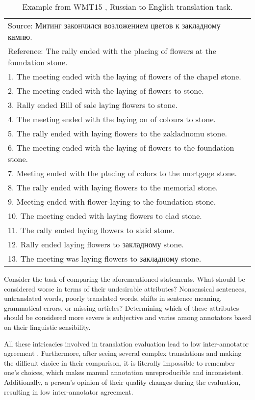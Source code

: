 \begin{table}[htb]
    \centering
    \begin{tabular}{l}
Source: Митинг закончился возложением цветов к закладному камню.\\
Reference: The rally ended with the placing of flowers at the foundation stone. \\
\hline
1. The meeting ended with the laying of flowers of the chapel stone. \\
2. The meeting ended with the laying of flowers to stone. \\
3. Rally ended Bill of sale laying flowers to stone. \\
4. The meeting ended with the laying on of colours to stone. \\
5. The rally ended with laying flowers to the zakladnomu stone. \\
6. The meeting ended with the laying of flowers to the foundation stone. \\
7. Meeting ended with the placing of colors to the mortgage stone. \\
8. The rally ended with laying flowers to the memorial stone.\\
9. Meeting ended with flower-laying to the foundation stone. \\
10. The meeting ended with laying flowers to clad stone.\\
11. The rally ended laying flowers to slaid stone.\\
12. Rally ended laying flowers to закладному stone.\\
13. The meeting was laying flowers to закладному stone.\\
\end{tabular}
     \caption{Example from WMT15 \cite{wmt15}, Russian to English translation task.}
    \label{table:wmt15:example}
\end{table}

Consider the task of comparing the aforementioned statements. What should be considered worse in terms of their undesirable attributes? Nonsensical sentences, untranslated words, poorly translated words, shifts in sentence meaning, grammatical errors, or missing articles? Determining which of these attributes should be considered more severe is subjective and varies among annotators based on their linguistic sensibility.

All these intricacies involved in translation evaluation lead to low inter-annotator agreement \cite{wmt13}.  Furthermore, after seeing several complex translations and making the difficult choice in their comparison, it is literally impossible to remember one's choices, which makes manual annotation unreproducible and inconsistent. Additionally, a person's opinion of their quality changes during the evaluation, resulting in low inter-annotator agreement. 

